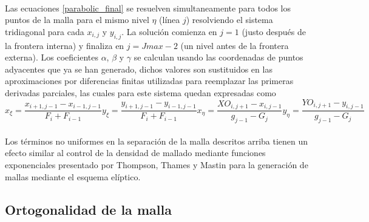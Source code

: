 \documentclass[letterpaper, openright, 12pt]{book}
\begin{document}
	\paragraph*{}
		Las ecuaciones \ref{parabolic_final} se resuelven simultaneamente para todos los puntos de la malla para el mismo nivel $\eta$ (línea $j$) resolviendo el sistema tridiagonal para cada $x_{i, j}$ y $y_{i, j}$. La solución comienza en $j = 1$ (justo después de la frontera interna) y finaliza en $j = Jmax - 2$ (un nivel antes de la frontera externa). Los coeficientes $\alpha$, $\beta$ y $\gamma$ se calculan usando las coordenadas de puntos adyacentes que ya se han generado, dichos valores son sustituidos en las aproximaciones por diferencias finitas utilizadas para reemplazar las primeras derivadas parciales, las cuales para este sistema quedan expresadas como\\
		\begin{subequations}
			\begin{equation}
				x_\xi = \frac{x_{i+1, j-1} - x_{i-1, j-1}}{F_i + F_{i-1}}
			\end{equation}
			\begin{equation}
				y_\xi = \frac{y_{i+1, j-1} - y_{i-1, j-1}}{F_i + F_{i-1}}
			\end{equation}
			\begin{equation}
				x_\eta = \frac{XO_{i, j+1} - x_{i, j-1}}{g_{j-1} - G_j}
			\end{equation}
			\begin{equation}
				y_\eta = \frac{YO_{i, j+1} - y_{i, j-1}}{g_{j-1} - G_j}
			\end{equation}
		\end{subequations}
	
	\paragraph*{}
		Los términos no uniformes en la separación de la malla descritos arriba tienen un efecto similar al control de la densidad de mallado mediante funciones exponenciales presentado por Thompson, Thames y Mastin \cite{thompson1974automatic} para la generación de mallas mediante el esquema elíptico.
	
	\subsection{Ortogonalidad de la malla}
\end{document}
